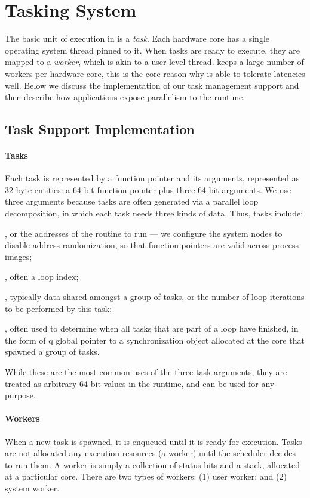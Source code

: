 \section{Tasking System}

The basic unit of execution in \Grappa is a {\em task}. Each hardware core has
a single operating system thread pinned to it. When tasks are ready to
execute, they are mapped to a {\em worker}, which is akin to a user-level
thread. \Grappa keeps a large number of workers per hardware core, this is the
core reason why \Grappa is able to tolerate latencies well. Below we discuss
the implementation of our task management support and then describe how
applications expose parallelism to the \Grappa runtime.

\subsection{Task Support Implementation}

\paragraph{Tasks}
Each task is represented by a function pointer and its arguments, represented
as 32-byte entities: a 64-bit function pointer plus three 64-bit arguments. We
use three arguments because tasks are often generated via a parallel loop
decomposition, in which each task needs three kinds of data. Thus, tasks
include:

, or the addresses of the routine to run ---
we configure the system nodes to disable address randomization, so that
function pointers are valid across process images;

, often a loop index; 

, typically data shared amongst a group of
tasks, or the number of loop iterations to be performed by this task;

, often used to determine when all
tasks that are part of a loop have finished, in the form of q global pointer
to a synchronization object allocated at the core that spawned a group of
tasks.

While these are the most common uses of the three task arguments, they are
treated as arbitrary 64-bit values in the runtime, and can be used for any
purpose.

\paragraph{Workers}
When a new task is spawned, it is enqueued until it is ready for execution.
Tasks are not allocated any execution resources (a worker) until the scheduler
decides to run them. A worker is simply a collection of status bits and a
stack, allocated at a particular core. There are two types of workers: (1) user worker; and (2) system worker. 

